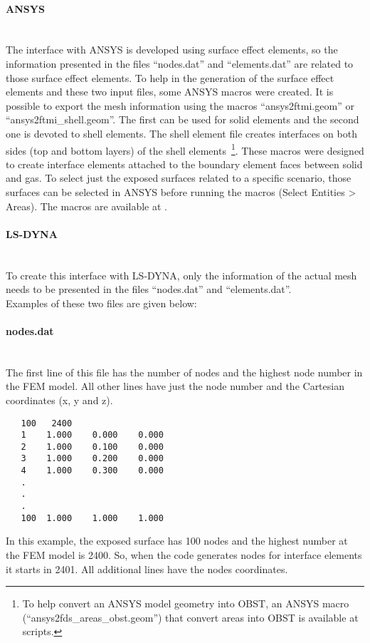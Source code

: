 \documentclass[11pt]{book}
\begin{document}
\paragraph{A{\footnotesize NSYS}}~\\ The interface with A{\footnotesize NSYS} is developed using surface effect elements, so the information presented in the files ``nodes.dat'' and ``elements.dat'' are related to those surface effect elements. To help in the generation of the surface effect elements and these two input files, some A{\footnotesize NSYS} macros were created. It is possible to export the mesh information using the macros ``ansys2ftmi.geom'' or ``ansys2ftmi\_shell.geom''. The first can be used for solid elements and the second one is devoted to shell elements. The shell element file creates interfaces on both sides (top and bottom layers) of the shell elements~\footnote{To help convert an A{\footnotesize NSYS} model geometry into {\ct OBST}, an A{\footnotesize NSYS} macro (``ansys2fds\_areas\_obst.geom'') that convert areas into {\ct OBST} is available at scripts.}. These macros were designed to create interface elements attached to the boundary element faces between solid and gas. To select just the exposed surfaces related to a specific scenario, those surfaces can be selected in A{\footnotesize NSYS} before running the macros (Select Entities > Areas). The macros are available at . 

\paragraph{LS-DYNA}~\\ To create this interface with LS-DYNA, only the information of the actual mesh needs to be presented in the files ``nodes.dat'' and ``elements.dat''. \\

Examples of these two files are given below:

\paragraph{nodes.dat}~\\
The first line of this file has the number of nodes and the highest node number in the FEM model. All other lines have just the node number and the Cartesian coordinates (x, y and z). 
\begin{verbatim}
   100   2400
   1    1.000    0.000    0.000
   2    1.000    0.100    0.000
   3    1.000    0.200    0.000
   4    1.000    0.300    0.000
   .
   .
   .
   100  1.000    1.000    1.000
\end{verbatim}
In this example, the exposed surface has 100 nodes and the highest number at the FEM model is 2400. So, when the code generates nodes for interface elements it starts in 2401. All additional lines have the nodes coordinates.
\end{document}
